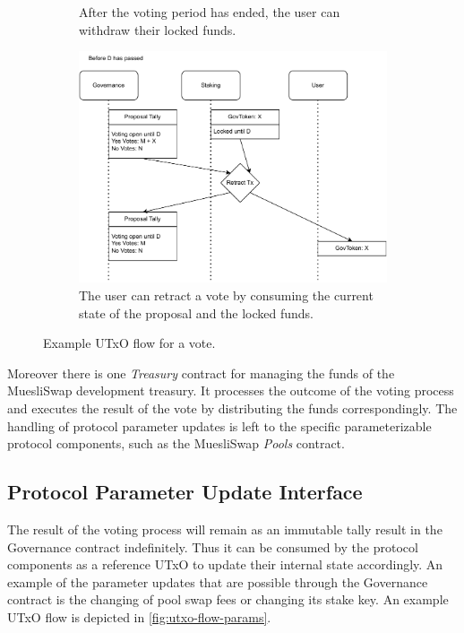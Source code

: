 \documentclass[11pt]{article}
\begin{document}
\begin{figure}
\begin{subfigure}[b]{0.35\textwidth}
        \caption{After the voting period has ended, the user can withdraw their locked funds.}
        \label{fig:utxo-flow-withdraw}
    \end{subfigure}
    \hfill
    \vspace{1em}
    \begin{subfigure}[b]{0.5\textwidth}
        \centering
        \includegraphics[width=\textwidth]{figures/userflow-contracts-2.pdf}
        \caption{The user can retract a vote by consuming the current state of the proposal and the locked funds.}
        \label{fig:utxo-flow-retract}
    \end{subfigure}
    \caption{Example UTxO flow for a vote.}
    \label{fig:utxo-flow-vote-complete}
\end{figure}

Moreover there is one \emph{Treasury} contract for managing the funds of the MuesliSwap development treasury.
It processes the outcome of the voting process and executes the result of the vote by distributing the funds correspondingly.
The handling of protocol parameter updates is left to the specific parameterizable protocol components,
such as the MuesliSwap \emph{Pools} contract.

\subsection{Protocol Parameter Update Interface}

The result of the voting process will remain as an immutable tally result in the Governance contract
indefinitely.
Thus it can be consumed by the protocol components as a reference UTxO to update their internal state accordingly.
An example of the parameter updates that are possible through the Governance contract is the changing of pool swap fees
or changing its stake key.
An example UTxO flow is depicted in \cref{fig:utxo-flow-params}.
\end{document}
